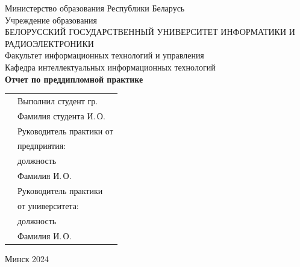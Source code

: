 \begin{titlepage}
    
    \begin{center}
        Министерство образования Республики Беларусь \\[0.4cm] 

        Учреждение образования \\

        \MakeUppercase{БЕЛОРУССКИЙ ГОСУДАРСТВЕННЫЙ УНИВЕРСИТЕТ ИНФОРМАТИКИ И РАДИОЭЛЕКТРОНИКИ} \\[0.4cm]

        Факультет информационных технологий и управления \\[0.4cm]

        Кафедра интеллектуальных информационных технологий \\[3.4cm] %

        {\large\bfseries{Отчет по преддипломной практике}} \\[2cm]

        \noindent
        \begin{tabular}{p{}p{}}
            & Выполнил студент гр.  \\
            & Фамилия студента И.\,О. \\[1cm]

            & Руководитель практики от \\
            & предприятия: \\
            & должность \\
            & Фамилия И.\,О. \\[1cm]

            & Руководитель практики \\
            & от университета: \\
            & должность \\
            & Фамилия И.\,О. \\
        \end{tabular}

        \vfill

        {\normalsize Минск 2024}
    \end{center}

\end{titlepage}
